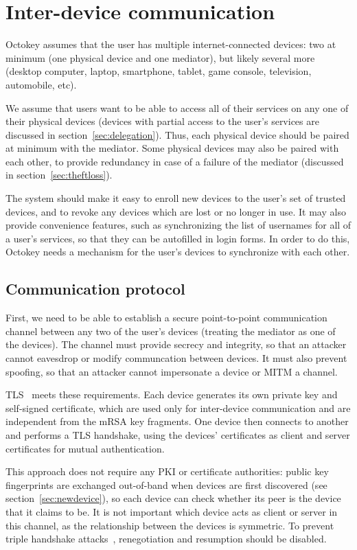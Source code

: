 \section{Inter-device communication}\label{sec:interdevice}

Octokey assumes that the user has multiple internet-connected devices: two at minimum (one physical
device and one mediator), but likely several more (desktop computer, laptop, smartphone, tablet,
game console, television, automobile, etc).

We assume that users want to be able to access all of their services on any one of their physical
devices (devices with partial access to the user's services are discussed in
section~\ref{sec:delegation}). Thus, each physical device should be paired at minimum with the
mediator. Some physical devices may also be paired with each other, to provide redundancy in case of
a failure of the mediator (discussed in section~\ref{sec:theftloss}).

The system should make it easy to enroll new devices to the user's set of trusted devices, and to
revoke any devices which are lost or no longer in use. It may also provide convenience features,
such as synchronizing the list of usernames for all of a user's services, so that they can be
autofilled in login forms. In order to do this, Octokey needs a mechanism for the user's devices to
synchronize with each other.

\subsection{Communication protocol}\label{sec:channels}

First, we need to be able to establish a secure point-to-point communication channel between any two
of the user's devices (treating the mediator as one of the devices). The channel must provide
secrecy and integrity, so that an attacker cannot eavesdrop or modify communcation between devices.
It must also prevent spoofing, so that an attacker cannot impersonate a device or MITM a channel.

TLS~\cite{TLS} meets these requirements. Each device generates its own private key and self-signed
certificate, which are used only for inter-device communication and are independent from the mRSA
key fragments. One device then connects to another and performs a TLS handshake, using the devices'
certificates as client and server certificates for mutual authentication.

This approach does not require any PKI or certificate authorities: public key fingerprints are
exchanged out-of-band when devices are first discovered (see section~\ref{sec:newdevice}), so each
device can check whether its peer is the device that it claims to be. It is not important which
device acts as client or server in this channel, as the relationship between the devices is
symmetric. To prevent triple handshake attacks~\cite{Bhargavan14}, renegotiation and resumption
should be disabled.

